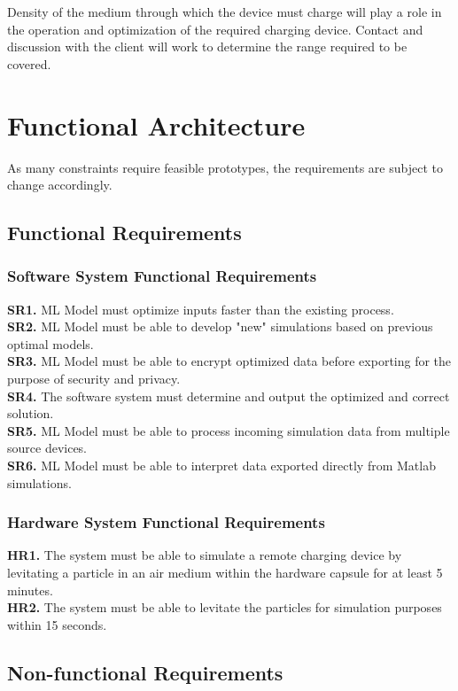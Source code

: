 \documentclass[12pt, titlepage]{article}
\begin{document}
Density of the medium through which the device must charge will play a role in the operation and optimization of the required charging device. Contact and discussion with the client will work to determine the range required to be covered. 

\newpage 

\section{Functional Architecture}
As many constraints require feasible prototypes, the requirements are subject to change accordingly.
\subsection{Functional Requirements}
\subsubsection{Software System Functional Requirements}
\textbf{SR1.} ML Model must optimize inputs faster than the existing process.\\
\textbf{SR2.} ML Model must be able to develop "new" simulations based on previous optimal models.\\
\textbf{SR3.} ML Model must be able to encrypt optimized data before exporting for the purpose of security and privacy.\\
\textbf{SR4.} The software system must determine and output the optimized and correct solution.\\
\textbf{SR5.} ML Model must be able to process incoming simulation data from multiple source devices.\\
\textbf{SR6.} ML Model must be able to interpret data exported directly from Matlab simulations.

\color{black}

\subsubsection{Hardware System Functional Requirements}
\textbf{HR1.} The system must be able to simulate a remote charging device by levitating a particle in an air medium within the hardware capsule for at least 5 minutes.\\
\textbf{HR2.} The system must be able to levitate the particles for simulation purposes within 15 seconds.\\

\subsection{Non-functional Requirements}
\end{document}
